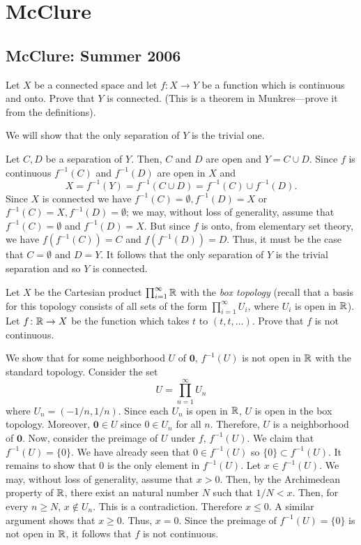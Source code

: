 \section{McClure}
\subsection{McClure: Summer 2006}
\setcounter{exercise}{0}
\setcounter{equation}{0}

\begin{problem}
  Let $X$ be a connected space and let $f\colon X\to Y$ be a function which
  is continuous and onto. Prove that $Y$ is connected. (This is a theorem
  in Munkres---prove it from the definitions).
\end{problem}
\begin{solution}
  We will show that the only separation of $Y$ is the trivial one.

  Let $C,D$ be a separation of $Y$. Then, $C$ and $D$ are open and $Y=C\cup
  D$. Since $f$ is continuous $f^{-1}(C)$ and $f^{-1}(D)$ are open in $X$
  and
  \[
    X=f^{-1}(Y)=f^{-1}(C\cup D)=f^{-1}(C)\cup f^{-1}(D).
  \]
  Since $X$ is connected we have $f^{-1}(C)=\emptyset,f^{-1}(D)=X$ or
  $f^{-1}(C)=X,f^{-1}(D)=\emptyset$; we may, without loss of generality,
  assume that $f^{-1}(C)=\emptyset$ and $f^{-1}(D)=X$. But since $f$ is
  onto, from elementary set theory, we have $f(f^{-1}(C))=C$ and
  $f(f^{-1}(D))=D$. Thus, it must be the case that $C=\emptyset$ and
  $D=Y$. It follows that the only separation of $Y$ is the trivial
  separation and so $Y$ is connected.
\end{solution}

\begin{problem}
  Let $X$ be the Cartesian product $\prod_{i=1}^\infty\mathbb{R}$ with the
  \emph{box topology} (recall that a basis for this topology consists of
  all sets of the form $\prod_{i=1}^\infty U_i$, where $U_i$ is open in
  $\mathbb{R}$). Let $f\colon\mathbb{R}\to X$ be the function which takes $t$ to
  $(t,t,\ldots)$. Prove that $f$ is not continuous.
\end{problem}
\begin{solution}
  We show that for some neighborhood $U$ of $\mathbf{0}$, $f^{-1}(U)$ is
  not open in $\mathbb{R}$ with the standard topology. Consider the set
  \[
    U=\prod_{n=1}^\infty U_n
  \]
  where $U_n=(-1/n,1/n)$. Since each $U_n$ is open in $\mathbb{R}$, $U$ is open
  in the box topology. Moreover, $\mathbf{0}\in U$ since $0\in U_n$ for all
  $n$. Therefore, $U$ is a neighborhood of $\mathbf{0}$. Now, consider the
  preimage of $U$ under $f$, $f^{-1}(U)$. We claim that
  $f^{-1}(U)=\{0\}$. We have already seen that $0\in f^{-1}(U)$ so
  $\{0\}\subset f^{-1}(U)$. It remains to show that $0$ is the only element
  in $f^{-1}(U)$. Let $x\in f^{-1}(U)$. We may, without loss of generality,
  assume that $x>0$. Then, by the Archimedean property of $\mathbb{R}$, there
  exist an natural number $N$ such that $1/N<x$. Then, for every $n\geq N$,
  $x\notin U_n$. This is a contradiction. Therefore $x\leq 0$. A similar
  argument shows that $x\geq 0$. Thus, $x=0$. Since the preimage of
  $f^{-1}(U)=\{0\}$ is not open in $\mathbb{R}$, it follows that $f$ is not
  continuous.
\end{solution}


